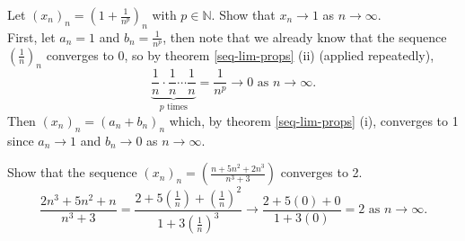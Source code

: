 \documentclass[../real_analysis.tex]{subfiles}
\begin{document}
        \begin{example}
            Let $(x_n)_n=\left(1+\frac{1}{n^p}\right)_n$ with $p\in\mathbb{N}$. Show that $x_n\to1$ as $n\to\infty$.\\
            First, let $a_n=1$ and $b_n=\frac{1}{n^p}$, then note that we already know that the sequence $\left(\frac{1}{n}\right)_n$ converges to 0, so by theorem \ref{seq-lim-props} (ii) (applied repeatedly),
            \begin{equation}
                \underbrace{\frac{1}{n}\cdot\frac{1}{n}\cdots\frac{1}{n}}_{p\text{ times}}=\frac{1}{n^p}\to0\text{ as }n\to\infty.
            \end{equation}
            Then $(x_n)_n=(a_n+b_n)_n$ which, by theorem \ref{seq-lim-props} (i), converges to 1 since $a_n\to1$ and $b_n\to0$ as $n\to\infty$.
        \end{example}
        \begin{example}
            Show that the sequence $(x_n)_n=\left(\frac{n+5n^2+2n^3}{n^3+3}\right)$ converges to 2.\\
            \begin{equation}
                \frac{2n^3+5n^2+n}{n^3+3}=\frac{2+5\left(\frac{1}{n}\right)+\left(\frac{1}{n}\right)^2}{1+3\left(\frac{1}{n}\right)^3}\to\frac{2+5(0)+0}{1+3(0)}=2\text{ as }n\to\infty.
            \end{equation}
        \end{example}
\end{document}

